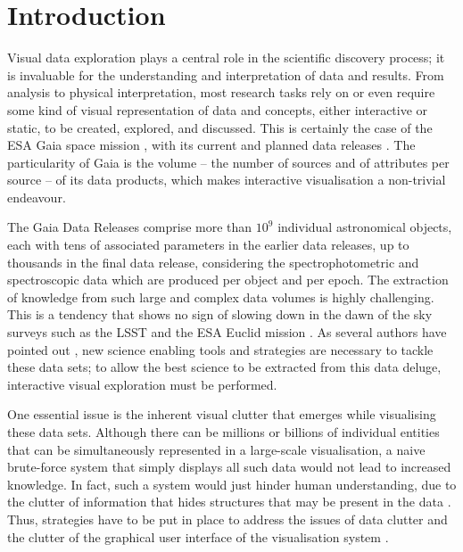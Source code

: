 \documentclass[longauth, final]{aa}
\begin{document}




\maketitle


\section{Introduction}

Visual data exploration plays a central role in the scientific discovery process; it is invaluable for the understanding and interpretation of data and results. From analysis to physical interpretation, most research tasks rely on or even require some kind of visual representation of data and concepts, either interactive or static, to be created, explored, and discussed. This is certainly the case of the ESA Gaia space mission \citep{2016A&A...595A...1G},  with its current and planned data releases \citep[e.g.][]{2016A&A...595A...2G}. The particularity of Gaia is the volume -- the number of sources and of attributes per source -- of its data products, which makes interactive visualisation a non-trivial endeavour.

The Gaia Data Releases comprise more than $10^9$ individual astronomical objects, each with tens of associated parameters in the earlier data releases, up to thousands in the final data release, considering the spectrophotometric and spectroscopic data which are produced per object and per epoch. The extraction of knowledge from such large and complex data volumes  is highly challenging. This is a tendency that shows no sign of slowing down in the dawn of the sky surveys such as the LSST \citep{2008arXiv0805.2366I} and the ESA Euclid mission \citep{2011arXiv1110.3193L}. As  several authors have pointed out \citep[e.g.][]{2001Sci...293.2037S, unwin:graphics:2006, hey:fourthparadigm:2009, 2017PASP..129b8001B}, new science enabling tools and strategies are necessary to tackle these data sets;  to allow the best science to be extracted from this data deluge, interactive visual exploration must be performed. 


One essential issue is the inherent visual clutter that emerges while visualising these data sets. Although there can be millions or billions of individual entities that can be simultaneously represented in a large-scale visualisation, a naive brute-force system that simply displays all such data would not lead to increased knowledge. In fact, such a system would just hinder human understanding, due to the clutter of information that hides structures that may be present in the data \cite[e.g.][]{Peng04clutterreduction}. Thus, strategies  have to be put in place to address the issues of data clutter and  the clutter of the graphical user interface of the visualisation system \citep[e.g.][]{Rosenholtz05featurecongestion}.
\end{document}
